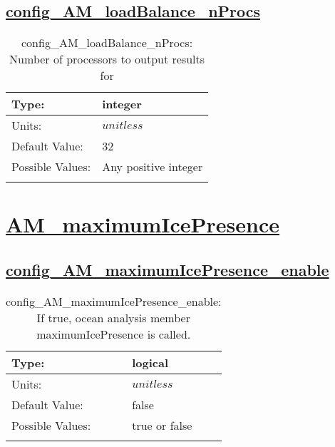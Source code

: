 \subsection[config\_AM\_loadBalance\_nProcs]{\hyperref[sec:nm_tab_AM_loadBalance]{config\_AM\_loadBalance\_nProcs}}
\label{subsec:nm_sec_config_AM_loadBalance_nProcs}
\begin{center}
\begin{longtable}{| p{2.0in} || p{4.0in} |}
    \hline
    Type: & integer \\
    \hline
    Units: & $unitless$ \\
    \hline
    Default Value: & 32 \\
    \hline
    Possible Values: & Any positive integer \\
    \hline
    \caption{config\_AM\_loadBalance\_nProcs: Number of processors to output results for}
\end{longtable}
\end{center}
\section[AM\_maximumIcePresence]{\hyperref[sec:nm_tab_AM_maximumIcePresence]{AM\_maximumIcePresence}}
\label{sec:nm_sec_AM_maximumIcePresence}
\subsection[config\_AM\_maximumIcePresence\_enable]{\hyperref[sec:nm_tab_AM_maximumIcePresence]{config\_AM\_maximumIcePresence\_enable}}
\label{subsec:nm_sec_config_AM_maximumIcePresence_enable}
\begin{center}
\begin{longtable}{| p{2.0in} || p{4.0in} |}
    \hline
    Type: & logical \\
    \hline
    Units: & $unitless$ \\
    \hline
    Default Value: & false \\
    \hline
    Possible Values: & true or false \\
    \hline
    \caption{config\_AM\_maximumIcePresence\_enable: If true, ocean analysis member maximumIcePresence is called.}
\end{longtable}
\end{center}
